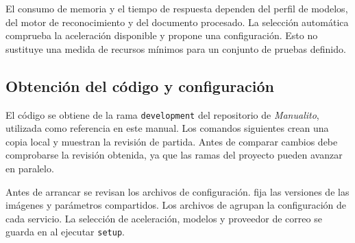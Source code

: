 El consumo de memoria y el tiempo de respuesta dependen del perfil de modelos, del motor de reconocimiento y del documento procesado. La selección automática comprueba la aceleración disponible y propone una configuración. Esto no sustituye una medida de recursos mínimos para un conjunto de pruebas definido.


\subsection{Obtención del código y configuración}

El código se obtiene de la rama \texttt{development} del repositorio de \textit{Manualito}, utilizada como referencia en este manual. Los comandos siguientes crean una copia local y muestran la revisión de partida. Antes de comparar cambios debe comprobarse la revisión obtenida, ya que las ramas del proyecto pueden avanzar en paralelo.


Antes de arrancar se revisan los archivos de configuración.  fija las versiones de las imágenes y parámetros compartidos. Los archivos de  agrupan la configuración de cada servicio. La selección de aceleración, modelos y proveedor de correo se guarda en  al ejecutar \texttt{setup}.

